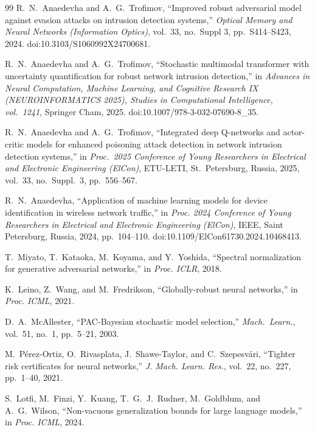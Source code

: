 \documentclass[journal,a4paper,10pt]{IEEEtran}
\theoremstyle{definition}
\theoremstyle{remark}
\begin{document}
\begin{thebibliography}{99}
R.~N.~Anaedevha and A.~G.~Trofimov, ``Improved robust adversarial model against evasion attacks on intrusion detection systems,'' \emph{Optical Memory and Neural Networks (Information Optics)}, vol.~33, no.~Suppl 3, pp.~S414--S423, 2024. doi:10.3103/S1060992X24700681.

R.~N.~Anaedevha and A.~G.~Trofimov, ``Stochastic multimodal transformer with uncertainty quantification for robust network intrusion detection,'' in \emph{Advances in Neural Computation, Machine Learning, and Cognitive Research IX (NEUROINFORMATICS 2025), Studies in Computational Intelligence, vol.~1241}, Springer Cham, 2025. doi:10.1007/978-3-032-07690-8\_35.

R.~N.~Anaedevha and A.~G.~Trofimov, ``Integrated deep Q-networks and actor-critic models for enhanced poisoning attack detection in network intrusion detection systems,'' in \emph{Proc.~2025 Conference of Young Researchers in Electrical and Electronic Engineering (ElCon)}, ETU-LETI, St.~Petersburg, Russia, 2025, vol.~33, no.~Suppl.~3, pp.~556--567.

R.~N.~Anaedevha, ``Application of machine learning models for device identification in wireless network traffic,'' in \emph{Proc. 2024 Conference of Young Researchers in Electrical and Electronic Engineering (ElCon)}, IEEE, Saint Petersburg, Russia, 2024, pp.~104--110. doi:10.1109/ElCon61730.2024.10468413.

T.~Miyato, T.~Kataoka, M.~Koyama, and Y.~Yoshida, ``Spectral normalization for generative adversarial networks,'' in \emph{Proc. ICLR}, 2018.

K.~Leino, Z.~Wang, and M.~Fredrikson, ``Globally-robust neural networks,'' in \emph{Proc. ICML}, 2021.

D.~A.~McAllester, ``{PAC}-Bayesian stochastic model selection,'' \emph{Mach.\ Learn.}, vol.~51, no.~1, pp.~5--21, 2003.

M.~P\'erez-Ortiz, O.~Rivasplata, J.~Shawe-Taylor, and C.~Szepesv\'ari, ``Tighter risk certificates for neural networks,'' \emph{J. Mach. Learn. Res.}, vol.~22, no.~227, pp.~1--40, 2021.

S.~Lotfi, M.~Finzi, Y.~Kuang, T.~G.~J.~Rudner, M.~Goldblum, and A.~G.~Wilson, ``Non-vacuous generalization bounds for large language models,'' in \emph{Proc. ICML}, 2024.


\end{thebibliography}
\end{document}
